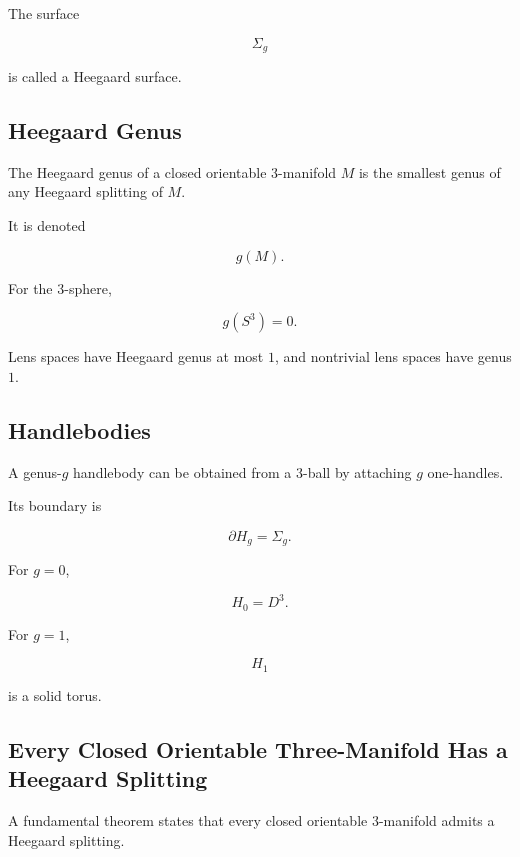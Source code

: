 The surface

\[
\Sigma_g
\]

is called a Heegaard surface.

\subsection{Heegaard Genus}
\label{subsec:heegaard-genus}

The Heegaard genus of a closed orientable \(3\)-manifold \(M\) is the
smallest genus of any Heegaard splitting of \(M\).

It is denoted

\[
\boxed{
g(M).
}
\]

For the \(3\)-sphere,

\[
\boxed{
g(S^3)=0.
}
\]

Lens spaces have Heegaard genus at most \(1\), and nontrivial lens spaces
have genus \(1\).

\subsection{Handlebodies}
\label{subsec:handlebodies-low-dimensional}

A genus-\(g\) handlebody can be obtained from a \(3\)-ball by attaching
\(g\) one-handles.

Its boundary is

\[
\boxed{
\partial H_g=\Sigma_g.
}
\]

For \(g=0\),

\[
H_0=D^3.
\]

For \(g=1\),

\[
H_1
\]

is a solid torus.

\subsection{Every Closed Orientable Three-Manifold Has a Heegaard Splitting}
\label{subsec:existence-heegaard}

A fundamental theorem states that every closed orientable \(3\)-manifold
admits a Heegaard splitting.

